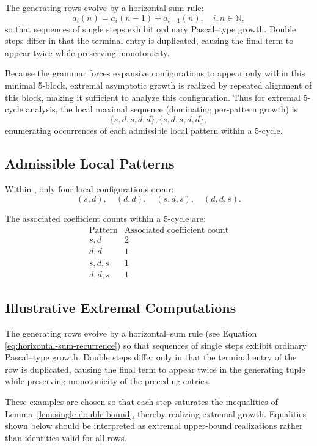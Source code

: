 \documentclass[12pt, oneside]{article}   	%
\numberwithin{equation}{section}          %
\theoremstyle{definition}
\begin{document}
The generating rows evolve by a horizontal-sum rule:
\begin{equation}
a_i(n) = a_i(n-1) + a_{i-1}(n), \quad i,n \in \mathbb{N},
\label{eq:horizontal-sum-recurrence}
\end{equation}
so that sequences of single steps exhibit ordinary Pascal--type growth.
Double steps differ in that the terminal entry is duplicated, causing the
final term to appear twice while preserving monotonicity.

Because the grammar forces expansive configurations to appear only within this minimal 5-block,
extremal asymptotic growth is realized by repeated alignment of this block, making it sufficient
to analyze this configuration.  Thus for extremal 5-cycle analysis, the local maximal sequence
(dominating per-pattern growth) is
\[
\{ s, d, s, d, d \}, \{ s, d, s, d, d \},
\]
enumerating occurrences of each admissible local pattern within a 5-cycle.

\subsection*{Admissible Local Patterns}
\label{sec:admissible-patterns}

Within , only four local configurations occur:
\[
(s, d), \quad (d, d), \quad (s, d, s), \quad (d, d, s).
\]

The associated coefficient counts within a 5-cycle are:
\[
\begin{array}{c|c}
\text{Pattern} & \text{Associated coefficient count} \\
\hline
s,d & 2 \\
d,d & 1 \\
s,d,s & 1 \\
d,d,s & 1
\end{array}
\]

\subsection{Illustrative Extremal Computations}

The generating rows evolve by a horizontal--sum rule (see Equation \ref{eq:horizontal-sum-recurrence})
so that sequences of single steps exhibit ordinary Pascal--type growth.
Double steps differ only in that the terminal entry of the row is duplicated,
causing the final term to appear twice in the generating tuple while preserving
monotonicity of the preceding entries.

These examples are chosen so that each step saturates the inequalities of
Lemma~\ref{lem:single-double-bound}, thereby realizing extremal growth. Equalities
shown below should be interpreted as extremal upper-bound realizations rather than
identities valid for all rows.
\end{document}
